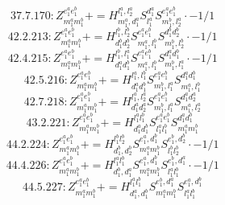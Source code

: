 \documentclass[letterpaper,10pt,fleqn,leqno,onecolumn]{article}
\begin{document}
\begin{equation} \;\;\;\;\;\;  37.7.170: Z^{e_{1}^{a}e_{1}^{b}}_{m_{1}^{a}m_{1}^{b}}+=H^{l_{1}^{a},l_{2}^{a}}_{m_{1}^{a},d_{1}^{a}}S^{d_{1}^{a}}_{l_{1}^{a}}S^{e_{1}^{a}e_{1}^{b}}_{m_{1}^{b},l_{2}^{a}}\cdot -1/1 \end{equation}
\begin{equation} \;\;\;\;\;\;  42.2.213: Z^{e_{1}^{a}e_{1}^{b}}_{m_{1}^{a}m_{1}^{b}}+=H^{l_{1}^{b},l_{2}^{b}}_{d_{1}^{b}d_{2}^{b}}S^{e_{1}^{a}e_{1}^{b}}_{m_{1}^{a},l_{1}^{b}}S^{d_{1}^{b}d_{2}^{b}}_{m_{1}^{b},l_{2}^{b}}\cdot -1/1 \end{equation}
\begin{equation} \;\;\;\;\;\;  42.4.215: Z^{e_{1}^{a}e_{1}^{b}}_{m_{1}^{a}m_{1}^{b}}+=H^{l_{1}^{b},l_{1}^{a}}_{d_{1}^{a}d_{1}^{b}}S^{e_{1}^{a}e_{1}^{b}}_{m_{1}^{a},l_{1}^{b}}S^{d_{1}^{a}d_{1}^{b}}_{m_{1}^{b},l_{1}^{a}}\cdot -1/1 \end{equation}
\begin{equation} \;\;\;\;\;\;  42.5.216: Z^{e_{1}^{a}e_{1}^{b}}_{m_{1}^{a}m_{1}^{b}}+=H^{l_{1}^{a},l_{1}^{b}}_{d_{1}^{a}d_{1}^{b}}S^{e_{1}^{a}e_{1}^{b}}_{m_{1}^{b},l_{1}^{a}}S^{d_{1}^{a}d_{1}^{b}}_{m_{1}^{a},l_{1}^{b}} \end{equation}
\begin{equation} \;\;\;\;\;\;  42.7.218: Z^{e_{1}^{a}e_{1}^{b}}_{m_{1}^{a}m_{1}^{b}}+=H^{l_{1}^{a},l_{2}^{a}}_{d_{1}^{a}d_{2}^{a}}S^{e_{1}^{a}e_{1}^{b}}_{m_{1}^{b},l_{1}^{a}}S^{d_{1}^{a}d_{2}^{a}}_{m_{1}^{a},l_{2}^{a}} \end{equation}
\begin{equation} \;\;\;\;\;\;  43.2.221: Z^{e_{1}^{a}e_{1}^{b}}_{m_{1}^{a}m_{1}^{b}}+=H^{l_{1}^{a}l_{1}^{b}}_{d_{1}^{a}d_{1}^{b}}S^{e_{1}^{a}e_{1}^{b}}_{l_{1}^{a}l_{1}^{b}}S^{d_{1}^{a}d_{1}^{b}}_{m_{1}^{a}m_{1}^{b}} \end{equation}
\begin{equation} \;\;\;\;\;\;  44.2.224: Z^{e_{1}^{a}e_{1}^{b}}_{m_{1}^{a}m_{1}^{b}}+=H^{l_{1}^{b}l_{2}^{b}}_{d_{1}^{b},d_{2}^{b}}S^{e_{1}^{a},d_{1}^{b}}_{m_{1}^{a}m_{1}^{b}}S^{e_{1}^{b},d_{2}^{b}}_{l_{1}^{b}l_{2}^{b}}\cdot -1/1 \end{equation}
\begin{equation} \;\;\;\;\;\;  44.4.226: Z^{e_{1}^{a}e_{1}^{b}}_{m_{1}^{a}m_{1}^{b}}+=H^{l_{1}^{a}l_{1}^{b}}_{d_{1}^{b},d_{1}^{a}}S^{e_{1}^{a},d_{1}^{b}}_{m_{1}^{a}m_{1}^{b}}S^{e_{1}^{b},d_{1}^{a}}_{l_{1}^{a}l_{1}^{b}}\cdot -1/1 \end{equation}
\begin{equation} \;\;\;\;\;\;  44.5.227: Z^{e_{1}^{a}e_{1}^{b}}_{m_{1}^{a}m_{1}^{b}}+=H^{l_{1}^{a}l_{1}^{b}}_{d_{1}^{a},d_{1}^{b}}S^{e_{1}^{b},d_{1}^{a}}_{m_{1}^{a}m_{1}^{b}}S^{e_{1}^{a},d_{1}^{b}}_{l_{1}^{a}l_{1}^{b}} \end{equation}
\end{document}
